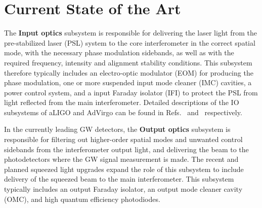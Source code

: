 \section{Current State of the Art}
The {\bf Input optics} subsystem is responsible for delivering the laser light from the pre-stabilized laser (PSL) system to the core interferometer in the correct spatial mode, with the necessary phase modulation sidebands, as well as with the required frequency, intensity and alignment stability conditions. This subsystem therefore typically includes an electro-optic modulator (EOM) for producing the phase modulation, one or more suspended input mode cleaner (IMC) cavities, a power control system, and a input Faraday isolator (IFI) to protect the PSL from light reflected from the main interferometer. Detailed descriptions of the IO subsystems of aLIGO and AdVirgo can be found in Refs.~\cite{aLIGO_IO} and~\cite{IOchapter} respectively. 

\noindent
In the currently leading GW detectors, the {\bf Output optics} subsystem is responsible for filtering out higher-order spatial modes and unwanted control sidebands from the interferometer output light, and delivering the beam to the photodetectors where the GW signal measurement is made. The recent and planned squeezed light upgrades expand the role of this subsystem to include delivery of the squeezed beam to the main interferometer. This subsystem typically includes an output Faraday isolator, an output mode cleaner cavity (OMC), and high quantum efficiency photodiodes.

